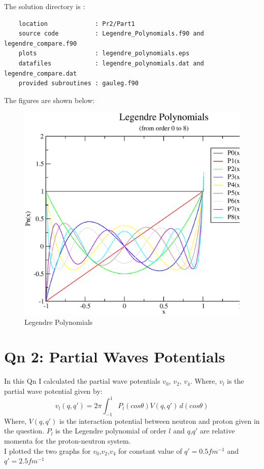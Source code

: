 \documentclass[11pt,a4paper,english]{article}
\begin{document}
	The solution directory is :\\
	\begin{verbatim}
	location             : Pr2/Part1
	source code          : Legendre_Polynomials.f90 and legendre_compare.f90
	plots                : legendre_polynomials.eps
	datafiles            : legendre_polynomials.dat and legendre_compare.dat
	provided subroutines : gauleg.f90 
	\end{verbatim}
	
	    The figures are shown below:\\
	\begin{figure}[h!]
	\centering
	\includegraphics [scale=0.6]{figures/legendre_polynomials.eps}
	\caption{Legendre Polynomials }
	\end{figure}
	\clearpage
	
\section{Qn 2: Partial Waves Potentials }
	
	
	In this Qn I calculated the partial wave potentials $v_0$, $v_2$, $v_4$.
	Where, $v_l$ is the partial wave potential given by:\\
	
	\begin{equation}
	v_l(q,q') = 2\pi \int_{-1}^{1} \!\! P_{l}(cos\theta) V(q,q')\,d(cos\theta)
	\end{equation}
	Where, $V(q,q')$ is the interaction potential between neutron and proton given
	in the question. $P_l$ is the Legendre polynomial of order $l$ and $q$,$q'$ are
	relative momenta for the proton-neutron system.\\
	I plotted the two graphs for $v_0$,$v_2$,$v_4$ for constant value of $q'=0.5 fm^{-1}$
	and $q'=2.5 fm^{-1}$
	  
\end{document}
